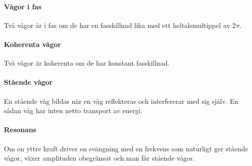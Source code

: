 \paragraph{Vågor i fas}
Två vågor är i fas om de har en fasskillnad lika med ett heltalsmultippel av $2\pi$.

\paragraph{Koherenta vågor}
Två vågor är koherenta om de har konstant fasskillnad.

\paragraph{Stående vågor}
En stående våg bildas när en våg reflekteras och interfererar med sig själv. En sådan våg har inten netto transport av energi.

\paragraph{Resonans}
Om en yttre kraft driver en svängning med en frekvens som naturligt ger stående vågor, växer amplituden obegränsat och man får stående vågor.